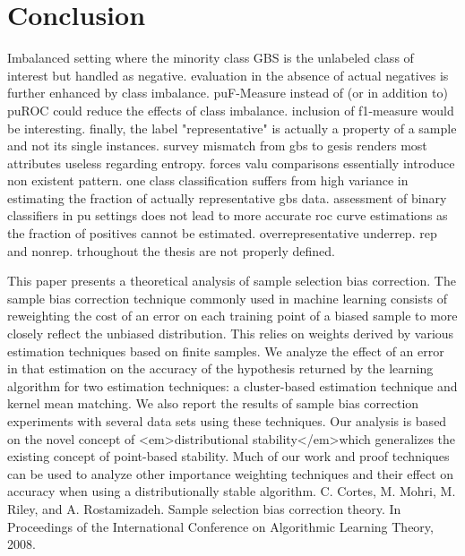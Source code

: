\chapter{Conclusion}\label{Sec:Conclusion}


Imbalanced setting where the minority class GBS is the unlabeled class of interest but handled as negative. evaluation in the absence of actual negatives is further enhanced by class imbalance. puF-Measure instead of (or in addition to) puROC could reduce the effects of class imbalance. inclusion of f1-measure would be interesting. finally, the label "representative" is actually a property of a sample and not its single instances. survey mismatch from gbs to gesis renders most attributes useless regarding entropy. forces valu comparisons essentially introduce non existent pattern. one class classification suffers from high variance in estimating the fraction of actually representative gbs data. assessment of binary classifiers in pu settings does not lead to more accurate roc curve estimations as the fraction of positives cannot be estimated. overrepresentative underrep. rep and nonrep. trhoughout the thesis are not properly defined.

This paper presents a theoretical analysis of sample selection bias correction. The sample bias correction technique commonly used in machine learning consists of reweighting the cost of an error on each training point of a biased sample to more closely reflect the unbiased distribution. This relies on weights derived by various estimation techniques based on finite samples. We analyze the effect of an error in that estimation on the accuracy of the hypothesis returned by the learning algorithm for two estimation techniques: a cluster-based estimation technique and kernel mean matching. We also report the results of sample bias correction experiments with several data sets using these techniques. Our analysis is based on the novel concept of <em>distributional stability</em>which generalizes the existing concept of point-based stability. Much of our work and proof techniques can be used to analyze other importance weighting techniques and their effect on accuracy when using a distributionally stable algorithm. C. Cortes, M. Mohri, M. Riley, and A. Rostamizadeh. Sample selection bias correction theory. In Proceedings of the International Conference on Algorithmic Learning Theory, 2008.